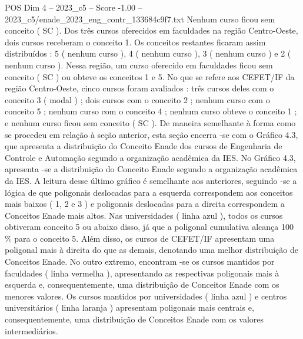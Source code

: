 \begin{textsample}{POS Dim 4 – 2023\_c5 – Score -1.00 – 2023\_c5/enade\_2023\_eng\_contr\_133684c9f7.txt}
Nenhum curso ficou sem conceito ( SC ).
Dos três cursos oferecidos em faculdades na região Centro-Oeste, dois cursos receberam o conceito 1.
Os conceitos restantes ficaram assim distribuídos : 5 ( nenhum curso ), 4 ( nenhum curso ), 3 ( nenhum curso ) e 2 ( nenhum curso ).
Nessa região, um curso oferecido em faculdades ficou sem conceito ( SC ) ou obteve os conceitos 1 e 5.
No que se refere aos CEFET/IF da região Centro-Oeste, cinco cursos foram avaliados : três cursos deles com o conceito 3 ( modal ) ; dois cursos com o conceito 2 ; nenhum curso com o conceito 5 ; nenhum curso com o conceito 4 ; nenhum curso obteve o conceito 1 ; e nenhum curso ficou sem conceito ( SC ).
De maneira semelhante à forma como se procedeu em relação à seção anterior, esta seção encerra -se com o Gráfico 4.3, que apresenta a distribuição do Conceito Enade dos cursos de Engenharia de Controle e Automação segundo a organização acadêmica da IES.
No Gráfico 4.3, apresenta -se a distribuição do Conceito Enade segundo a organização acadêmica da IES.
A leitura desse último gráfico é semelhante aos anteriores, seguindo -se a lógica de que poligonais deslocadas para a esquerda correspondem aos conceitos mais baixos ( 1, 2 e 3 ) e poligonais deslocadas para a direita correspondem a Conceitos Enade mais altos.
Nas universidades ( linha azul ), todos os cursos obtiveram conceito 5 ou abaixo disso, já que a poligonal cumulativa alcança 100 \% para o conceito 5.
Além disso, os cursos de CEFET/IF apresentam uma poligonal mais à direita do que as demais, denotando uma melhor distribuição de Conceitos Enade.
No outro extremo, encontram -se os cursos mantidos por faculdades ( linha vermelha ), apresentando as respectivas poligonais mais à esquerda e, consequentemente, uma distribuição de Conceitos Enade com os menores valores.
Os cursos mantidos por universidades ( linha azul ) e centros universitários ( linha laranja ) apresentam poligonais mais centrais e, consequentemente, uma distribuição de Conceitos Enade com os valores intermediários.

\end{textsample}
